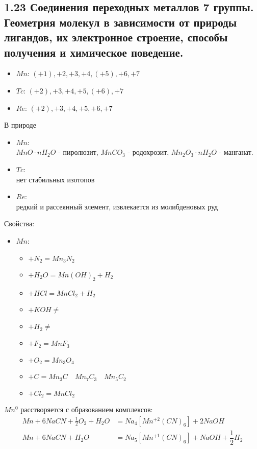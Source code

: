 
\subsection{1.23 Соединения переходных металлов 7 группы. Геометрия молекул в зависимости от природы лигандов, их электронное строение, способы получения и химическое поведение.}
\begin{itemize}
	\item $Mn$: $(+1), +2, +3, +4, (+5), +6, +7$	
	\item $Tc$: $(+2), +3, +4, +5, (+6), +7$
	\item $Re$: $(+2), +3, +4, +5, +6, +7$
\end{itemize}
В природе 
\begin{itemize}
	\item $Mn$: \\
	$MnO \cdot nH_2O$ - пиролюзит, $MnCO_3$ - родохрозит, $Mn_2O_3 \cdot nH_2O$ - манганат.
	\item $Tc$: \\
	нет стабильных изотопов
	\item $Re$: \\
	редкий и рассеянный  элемент, извлекается из молибденовых руд
\end{itemize}
Свойства:
\begin{itemize}
	\item $Mn$:
	\begin{itemize}
		\item $+ N_2 = Mn_3N_2 $
		\item $+ H_2O = Mn(OH)_2 + H_2 $
		\item $+ HCl = MnCl_2 + H_2 $
		\item $+ KOH \not =  $
		\item $+ H_2 \not = $
		\item $+ F_2  = MnF_3$
		\item $+ O_2 = Mn_3O_4 $
		\item $+ C = Mn_3C \quad Mn_7C_3 \quad Mn_5C_2 $
		\item $+ Cl_2 =  MnCl_2 $		
	\end{itemize}
\end{itemize}
$Mn^0$ расстворяется с образованием комплексов:
\begin{align*}
Mn + 6 NaCN + \frac12 O_2 + H_2O &= Na_4\left[Mn^{+2}(CN)_6\right] + 2NaOH \\
Mn + 6 NaCN + H_2O &= Na_5\left[Mn^{+1}(CN)_6\right] + NaOH + \dfrac12 H_2
\end{align*}
\begin{figure} [H]
	\centering {\texttt{[image: zz1]}}
\end{figure}
